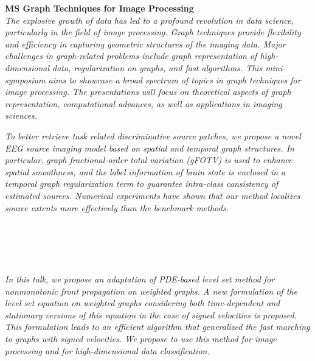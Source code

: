   \noindent\textbf{MS Graph Techniques for Image Processing}\\
  \textit{The explosive growth of data has led to a profound revolution in data science, particularly in the field of image processing. Graph techniques provide flexibility and efficiency in capturing geometric structures of the imaging data. Major challenges in graph-related problems include graph representation of high-dimensional data, regularization on graphs, and fast algorithms. This mini-symposium aims to showcase a broad spectrum of topics in graph techniques for image processing. The presentations will focus on theoretical aspects of graph representation, computational advances, as well as applications in imaging sciences.} \\
    
  \begin{multicols}{2}
      \textit{To better retrieve task related discriminative source patches, we propose a novel EEG source imaging model based on spatial and temporal graph structures. In particular, graph fractional-order total variation (gFOTV) is used to enhance spatial smoothness, and the label information of brain state is enclosed in a temporal graph regularization term to guarantee intra-class consistency of estimated sources. Numerical experiments have shown that our method localizes source extents more effectively than the benchmark methods.}\\
\\ 
        \\
        \\\\
\\
      \textit{In this talk, we propose an adaptation of  PDE-based level set method for nonmonotonic front propagation on weighted graphs.
A new formulation of the level set equation on weighted graphs considering both time-dependent and stationary versions of this equation in the case of signed velocities is proposed. This formulation leads to an efficient algorithm that generalized the fast marching to graphs with signed velocities. We propose to use this method for image processing and for high-dimensional data classification.}\\
\\ 
        \\
        \\\\
        \\

\end{multicols}
